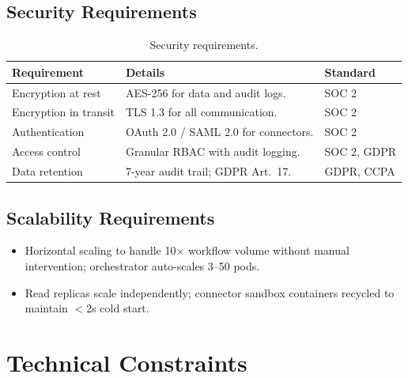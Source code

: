 \documentclass[
    language=english,
    doctype=article,
    institution=none,
]{../../omnilatex}
\begin{document}
\subsection{Security Requirements}

\begin{table}[htbp]
\centering\small
\begin{tabular}{@{}lp{5cm}l@{}}
    \toprule
    \textbf{Requirement} & \textbf{Details} & \textbf{Standard} \\
    \midrule
    Encryption at rest    & AES-256 for data and audit logs. &
        SOC 2 \\
    Encryption in transit & TLS 1.3 for all communication. & SOC 2 \\
    Authentication        & OAuth 2.0 / SAML 2.0 for connectors. &
        SOC 2 \\
    Access control        & Granular RBAC with audit logging. &
        SOC 2, GDPR \\
    Data retention        & 7-year audit trail; GDPR Art.\ 17. &
        GDPR, CCPA \\
    \bottomrule
\end{tabular}
\caption{Security requirements.}
\label{tab:security-req}
\end{table}

\subsection{Scalability Requirements}

\begin{itemize}
    \item Horizontal scaling to handle 10$\times$ workflow volume without
          manual intervention; orchestrator auto-scales 3--50 pods.
    \item Read replicas scale independently; connector sandbox containers
          recycled to maintain $<$2s cold start.
\end{itemize}

\section{Technical Constraints}
\end{document}
